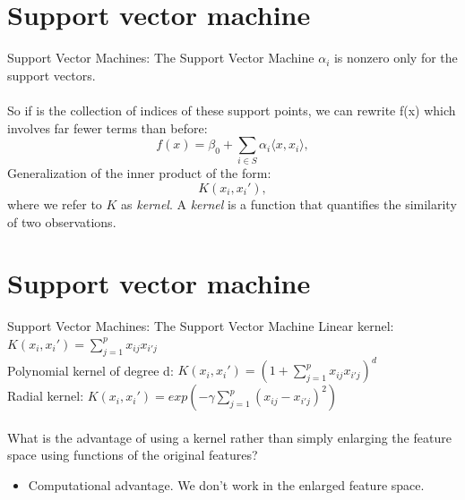 \documentclass[notes]{beamer}          %
\begin{document}
\section{Support vector machine}
\begin{frame}{Support Vector Machines: The Support Vector Machine}
$\alpha_i$ is nonzero only for the support vectors. \\~\\
So if  is the collection of indices of these support points, we can rewrite f(x) which involves far fewer terms than before:
\begin{equation*}
f(x) = \beta_0 + \sum_{i\in\mathit{S}} \alpha_i \langle {x,x_i} \rangle,
\end{equation*}
Generalization of the inner product of the form:
\begin{equation*}
\mathit{K}(x_i,x_i'),
\end{equation*}
where we refer to $\mathit{K}$ as \textit{kernel}. 
A \textit{kernel} is a function that quantifies the similarity of two observations.
\end{frame}
\section{Support vector machine}
\begin{frame}{Support Vector Machines: The Support Vector Machine}
Linear kernel: $\mathit{K}(x_i,x_i') = \sum_{j=1}^{p} x_{ij} x_{i'j}$ \\
Polynomial kernel of degree d: $\mathit{K}(x_i,x_i') = (1+ \sum_{j=1}^{p} x_{ij} x_{i'j})^d$\\
Radial kernel: $\mathit{K}(x_i,x_i') = exp(- \gamma \sum_{j=1}^{p} (x_{ij}-x_{i'j})^2)$ \\~\\
What is the advantage of using a kernel rather than simply enlarging the feature space using functions of the original features?
\begin{itemize}
 \item Computational advantage. We don't work in the enlarged feature space.
\end{itemize}

\end{frame}
\end{document}
